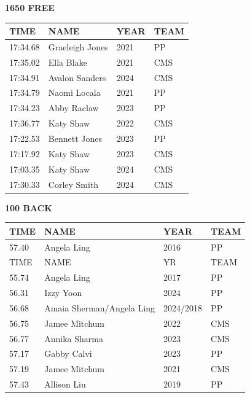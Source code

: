 \begin{table}[H]
\centering
\begin{minipage}[t]{0.48\textwidth}
\centering
\textbf{1650 FREE}\\[0.1cm]
\begin{tabular}{@{}p{1.8cm}p{2.8cm}p{1.2cm}p{1.4cm}@{}}
\hline
    \textbf{TIME} & \textbf{NAME} & \textbf{YEAR} & \textbf{TEAM} \\
\hline
    17:34.68 & Graeleigh Jones & 2021 & PP \\
    17:35.02 & Ella Blake & 2021 & CMS \\
    17:34.91 & Avalon Sanders & 2024 & CMS \\
    17:34.79 & Naomi Locala & 2021 & PP \\
    17:34.23 & Abby Raclaw & 2023 & PP \\
    17:36.77 & Katy Shaw & 2022 & CMS \\
    17:22.53 & Bennett Jones & 2023 & PP \\
    17:17.92 & Katy Shaw & 2023 & CMS \\
    17:03.35 & Katy Shaw & 2024 & CMS \\
    17:30.33 & Corley Smith & 2024 & CMS \\
\hline
\end{tabular}
\end{minipage}\hfill
\begin{minipage}[t]{0.48\textwidth}
\centering
\textbf{100 BACK}\\[0.1cm]
\begin{tabular}{@{}p{1.8cm}p{2.8cm}p{1.2cm}p{1.4cm}@{}}
\hline
    \textbf{TIME} & \textbf{NAME} & \textbf{YEAR} & \textbf{TEAM} \\
\hline
    57.40 & Angela Ling & 2016 & PP \\
     TIME &   NAME & YR & TEAM \\
    55.74 & Angela Ling & 2017 & PP \\
    56.31 & Izzy Yoon & 2024 & PP \\
    56.68 & Amaia Sherman/Angela Ling & 2024/2018 & PP \\
    56.75 & Jamee Mitchum & 2022 & CMS \\
    56.77 & Annika Sharma & 2023 & CMS \\
    57.17 & Gabby Calvi & 2023 & PP \\
    57.19 & Jamee Mitchum & 2021 & CMS \\
    57.43 & Allison Liu & 2019 & PP \\
\hline
\end{tabular}
\end{minipage}
\end{table}

